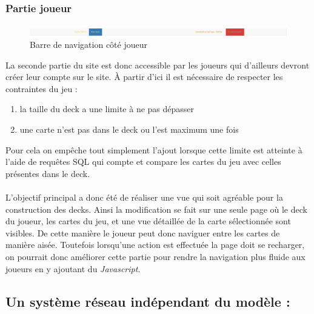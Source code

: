 \documentclass[a4paper, titlepage]{livret}
\begin{document}
	\subsubsection{Partie joueur}
	\paragraph{}

	\begin{figure}[th]
      	 \begin{center}
          \includegraphics[scale=0.25]{Assets/navbar_joueur.png}
          \caption{Barre de navigation côté joueur}
          \label{RepTravail}
         \end{center}
        \end{figure}

      La seconde partie du site est donc accessible par les joueurs qui d'ailleurs devront créer leur compte sur le site. À partir d'ici il est nécessaire de respecter les contraintes du jeu : 

	\begin{enumerate}
		\item la taille du deck a une limite à ne pas dépasser
		\item une carte n'est pas dans le deck ou l'est maximum une fois
	\end{enumerate}Pour cela on empêche tout simplement l'ajout lorsque cette limite est atteinte à l'aide de requêtes SQL qui compte et compare les cartes du jeu avec celles présentes dans le deck.
	
	\paragraph{}
	L'objectif principal a donc été de réaliser une vue qui soit agréable pour la construction des decks. Ainsi la modification se fait sur une seule page où le deck du joueur, les cartes du jeu, et une vue détaillée de la carte sélectionnée sont visibles. De cette manière le joueur peut donc naviguer entre les cartes de manière aisée. Toutefois lorsqu'une action est effectuée la page doit se recharger, on pourrait donc améliorer cette partie pour rendre la navigation plus fluide aux joueurs en y ajoutant du \textit{Javascript}.



	\subsection{Un système réseau indépendant du modèle :}
	
\end{document}
